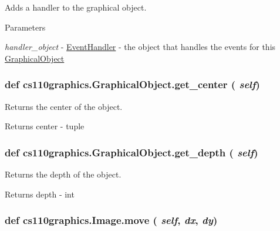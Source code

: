 Adds a handler to the graphical object. 
\begin{DoxyParams}{Parameters}
\item[{\em handler\_\-object}]-\/ \hyperlink{classcs110graphics_1_1EventHandler}{EventHandler} -\/ the object that handles the events for this \hyperlink{classcs110graphics_1_1GraphicalObject}{GraphicalObject} \end{DoxyParams}
\hypertarget{classcs110graphics_1_1GraphicalObject_a062789c4cc9de38af32dcc4ff2058607}{
\subsubsection[{get\_\-center}]{\setlength{\rightskip}{0pt plus 5cm}def cs110graphics.GraphicalObject.get\_\-center ( {\em self})}}
\label{classcs110graphics_1_1GraphicalObject_a062789c4cc9de38af32dcc4ff2058607}


Returns the center of the object. \begin{DoxyReturn}{Returns}
center -\/ tuple 
\end{DoxyReturn}
\hypertarget{classcs110graphics_1_1GraphicalObject_a6d9f5718cd0cf249e0d2842971bae17f}{
\subsubsection[{get\_\-depth}]{\setlength{\rightskip}{0pt plus 5cm}def cs110graphics.GraphicalObject.get\_\-depth ( {\em self})}}
\label{classcs110graphics_1_1GraphicalObject_a6d9f5718cd0cf249e0d2842971bae17f}


Returns the depth of the object. \begin{DoxyReturn}{Returns}
depth -\/ int 
\end{DoxyReturn}
\hypertarget{classcs110graphics_1_1Image_a540d48247976343a91c610009a9af8cd}{
\subsubsection[{move}]{\setlength{\rightskip}{0pt plus 5cm}def cs110graphics.Image.move ( {\em self}, \/   {\em dx}, \/   {\em dy})}}
\label{classcs110graphics_1_1Image_a540d48247976343a91c610009a9af8cd}


